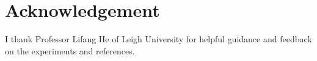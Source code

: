 \documentclass{article}
\begin{document}
\section*{Acknowledgement}
I thank Professor Lifang He of Leigh University for helpful guidance and feedback on the experiments and references.

  


\begin{thebibliography}{1}
\end{thebibliography}
\end{document}
